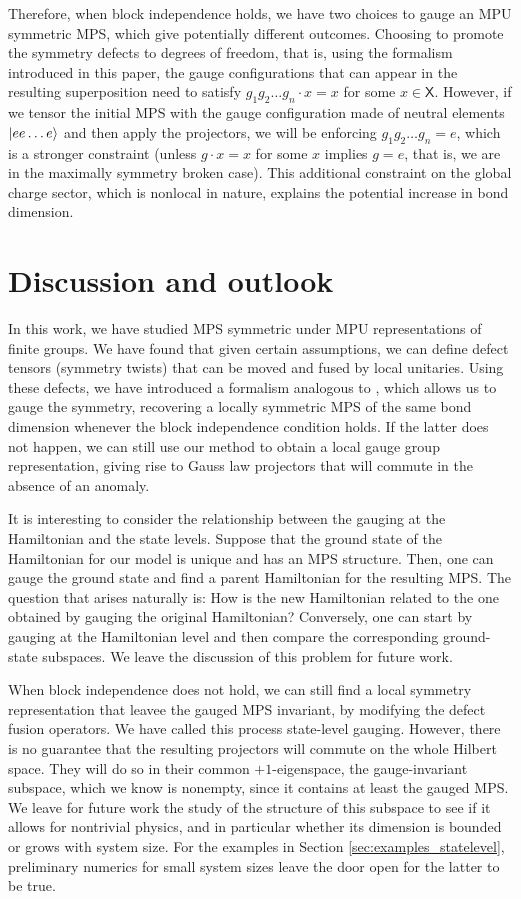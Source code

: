\documentclass[reprint,
superscriptaddress,
amsmath,amssymb,
notitlepage,
aps,
prb,
10pt, 
tightenlines
]{revtex4-2}
\begin{document}
Therefore, when block independence holds, we have two choices to gauge an MPU symmetric MPS, which give potentially different outcomes. Choosing to promote the symmetry defects to degrees of freedom, that is, using the formalism introduced in this paper, the gauge configurations that can appear in the resulting superposition need to satisfy $g_1g_2\ldots g_n\cdot x = x$ for some $x\in\mathsf{X}$. However, if we tensor the initial MPS with the gauge configuration made of neutral elements $|ee\ldots e\rangle$ and then apply the projectors, we will be enforcing $g_1g_2\ldots g_n = e$, which is a stronger constraint (unless $g\cdot x = x$ for some $x$ implies $g=e$, that is, we are in the maximally symmetry broken case). This additional constraint on the global charge sector, which is nonlocal in nature, explains the potential increase in bond dimension.

\section{Discussion and outlook}
\label{sec:outlook}

In this work, we have studied MPS symmetric under MPU representations of finite groups. We have found that given certain assumptions, we can define defect tensors (symmetry twists) that can be moved and fused by local unitaries. Using these defects, we have introduced a formalism analogous to \cite{Seifnashri}, which allows us to gauge the symmetry, recovering a locally symmetric MPS of the same bond dimension whenever the block independence condition holds. If the latter does not happen, we can still use our method to obtain a local gauge group representation, giving rise to Gauss law projectors that will commute in the absence of an anomaly.

It is interesting to consider the relationship between the gauging at the Hamiltonian and the state levels. Suppose that the ground state of the Hamiltonian for our model is unique and has an MPS structure. Then, one can gauge the ground state and find a parent Hamiltonian for the resulting MPS. The question that arises naturally is: How is the new Hamiltonian related to the one obtained by gauging the original Hamiltonian? Conversely, one can start by gauging at the Hamiltonian level and then compare the corresponding ground-state subspaces. We leave the discussion of this problem for future work. 

When block independence does not hold, we can still find a local symmetry representation that leavee the gauged MPS invariant, by modifying the defect fusion operators. We have called this process state-level gauging. However, there is no guarantee that the resulting projectors will commute on the whole Hilbert space. They will do so in their common $+1$-eigenspace, the gauge-invariant subspace, which we know is nonempty, since it contains at least the gauged MPS. We leave for future work the study of the structure of this subspace to see if it allows for nontrivial physics, and in particular whether its dimension is bounded or grows with system size. For the examples in Section \ref{sec:examples_statelevel}, preliminary numerics for small system sizes leave the door open for the latter to be true.
\end{document}
